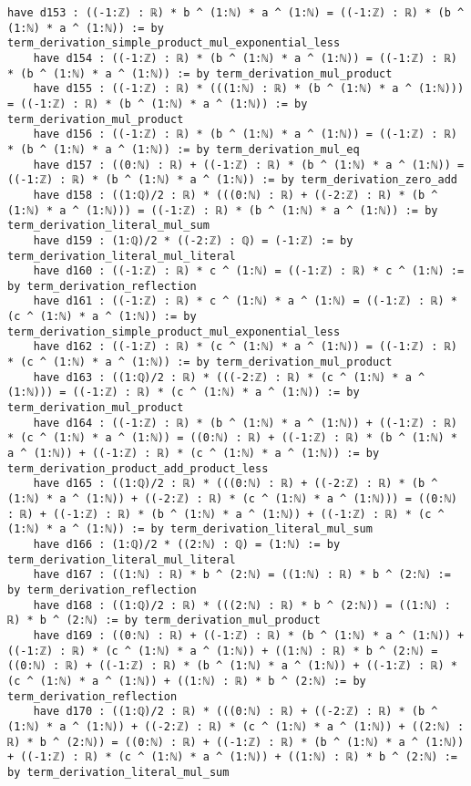 \documentclass{article}
\begin{document}
\begin{tcolorbox}[colback=white!10, width=\linewidth]
\begin{lstlisting}[language=Lean4]
    have d153 : ((-1:ℤ) : ℝ) * b ^ (1:ℕ) * a ^ (1:ℕ) = ((-1:ℤ) : ℝ) * (b ^ (1:ℕ) * a ^ (1:ℕ)) := by term_derivation_simple_product_mul_exponential_less
    have d154 : ((-1:ℤ) : ℝ) * (b ^ (1:ℕ) * a ^ (1:ℕ)) = ((-1:ℤ) : ℝ) * (b ^ (1:ℕ) * a ^ (1:ℕ)) := by term_derivation_mul_product
    have d155 : ((-1:ℤ) : ℝ) * (((1:ℕ) : ℝ) * (b ^ (1:ℕ) * a ^ (1:ℕ))) = ((-1:ℤ) : ℝ) * (b ^ (1:ℕ) * a ^ (1:ℕ)) := by term_derivation_mul_product
    have d156 : ((-1:ℤ) : ℝ) * (b ^ (1:ℕ) * a ^ (1:ℕ)) = ((-1:ℤ) : ℝ) * (b ^ (1:ℕ) * a ^ (1:ℕ)) := by term_derivation_mul_eq
    have d157 : ((0:ℕ) : ℝ) + ((-1:ℤ) : ℝ) * (b ^ (1:ℕ) * a ^ (1:ℕ)) = ((-1:ℤ) : ℝ) * (b ^ (1:ℕ) * a ^ (1:ℕ)) := by term_derivation_zero_add
    have d158 : ((1:ℚ)/2 : ℝ) * (((0:ℕ) : ℝ) + ((-2:ℤ) : ℝ) * (b ^ (1:ℕ) * a ^ (1:ℕ))) = ((-1:ℤ) : ℝ) * (b ^ (1:ℕ) * a ^ (1:ℕ)) := by term_derivation_literal_mul_sum
    have d159 : (1:ℚ)/2 * ((-2:ℤ) : ℚ) = (-1:ℤ) := by term_derivation_literal_mul_literal
    have d160 : ((-1:ℤ) : ℝ) * c ^ (1:ℕ) = ((-1:ℤ) : ℝ) * c ^ (1:ℕ) := by term_derivation_reflection
    have d161 : ((-1:ℤ) : ℝ) * c ^ (1:ℕ) * a ^ (1:ℕ) = ((-1:ℤ) : ℝ) * (c ^ (1:ℕ) * a ^ (1:ℕ)) := by term_derivation_simple_product_mul_exponential_less
    have d162 : ((-1:ℤ) : ℝ) * (c ^ (1:ℕ) * a ^ (1:ℕ)) = ((-1:ℤ) : ℝ) * (c ^ (1:ℕ) * a ^ (1:ℕ)) := by term_derivation_mul_product
    have d163 : ((1:ℚ)/2 : ℝ) * (((-2:ℤ) : ℝ) * (c ^ (1:ℕ) * a ^ (1:ℕ))) = ((-1:ℤ) : ℝ) * (c ^ (1:ℕ) * a ^ (1:ℕ)) := by term_derivation_mul_product
    have d164 : ((-1:ℤ) : ℝ) * (b ^ (1:ℕ) * a ^ (1:ℕ)) + ((-1:ℤ) : ℝ) * (c ^ (1:ℕ) * a ^ (1:ℕ)) = ((0:ℕ) : ℝ) + ((-1:ℤ) : ℝ) * (b ^ (1:ℕ) * a ^ (1:ℕ)) + ((-1:ℤ) : ℝ) * (c ^ (1:ℕ) * a ^ (1:ℕ)) := by term_derivation_product_add_product_less
    have d165 : ((1:ℚ)/2 : ℝ) * (((0:ℕ) : ℝ) + ((-2:ℤ) : ℝ) * (b ^ (1:ℕ) * a ^ (1:ℕ)) + ((-2:ℤ) : ℝ) * (c ^ (1:ℕ) * a ^ (1:ℕ))) = ((0:ℕ) : ℝ) + ((-1:ℤ) : ℝ) * (b ^ (1:ℕ) * a ^ (1:ℕ)) + ((-1:ℤ) : ℝ) * (c ^ (1:ℕ) * a ^ (1:ℕ)) := by term_derivation_literal_mul_sum
    have d166 : (1:ℚ)/2 * ((2:ℕ) : ℚ) = (1:ℕ) := by term_derivation_literal_mul_literal
    have d167 : ((1:ℕ) : ℝ) * b ^ (2:ℕ) = ((1:ℕ) : ℝ) * b ^ (2:ℕ) := by term_derivation_reflection
    have d168 : ((1:ℚ)/2 : ℝ) * (((2:ℕ) : ℝ) * b ^ (2:ℕ)) = ((1:ℕ) : ℝ) * b ^ (2:ℕ) := by term_derivation_mul_product
    have d169 : ((0:ℕ) : ℝ) + ((-1:ℤ) : ℝ) * (b ^ (1:ℕ) * a ^ (1:ℕ)) + ((-1:ℤ) : ℝ) * (c ^ (1:ℕ) * a ^ (1:ℕ)) + ((1:ℕ) : ℝ) * b ^ (2:ℕ) = ((0:ℕ) : ℝ) + ((-1:ℤ) : ℝ) * (b ^ (1:ℕ) * a ^ (1:ℕ)) + ((-1:ℤ) : ℝ) * (c ^ (1:ℕ) * a ^ (1:ℕ)) + ((1:ℕ) : ℝ) * b ^ (2:ℕ) := by term_derivation_reflection
    have d170 : ((1:ℚ)/2 : ℝ) * (((0:ℕ) : ℝ) + ((-2:ℤ) : ℝ) * (b ^ (1:ℕ) * a ^ (1:ℕ)) + ((-2:ℤ) : ℝ) * (c ^ (1:ℕ) * a ^ (1:ℕ)) + ((2:ℕ) : ℝ) * b ^ (2:ℕ)) = ((0:ℕ) : ℝ) + ((-1:ℤ) : ℝ) * (b ^ (1:ℕ) * a ^ (1:ℕ)) + ((-1:ℤ) : ℝ) * (c ^ (1:ℕ) * a ^ (1:ℕ)) + ((1:ℕ) : ℝ) * b ^ (2:ℕ) := by term_derivation_literal_mul_sum

\end{lstlisting}
\end{tcolorbox}
\end{document}
